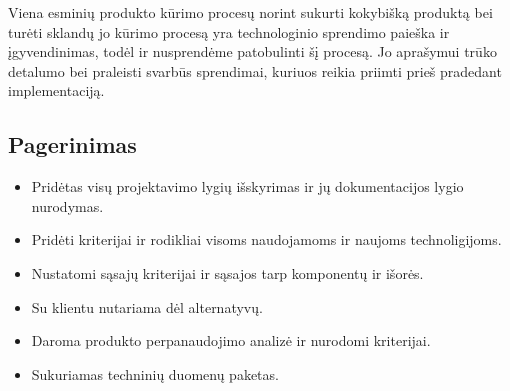 \documentclass{VUMIFPSkursinis}
\begin{document}
		Viena esminių produkto kūrimo procesų norint sukurti kokybišką produktą bei turėti sklandų jo kūrimo procesą yra technologinio sprendimo paieška ir įgyvendinimas, todėl ir nusprendėme patobulinti šį procesą. Jo aprašymui trūko detalumo bei praleisti svarbūs sprendimai, kuriuos reikia priimti prieš pradedant implementaciją.
		\subsection{Pagerinimas}
		\begin{itemize}
			\item{Pridėtas visų projektavimo lygių išskyrimas ir jų dokumentacijos lygio nurodymas.}
			\item{Pridėti kriterijai ir rodikliai visoms naudojamoms ir naujoms technoligijoms.}
			\item{Nustatomi sąsajų kriterijai ir sąsajos tarp komponentų ir išorės.}
			\item{Su klientu nutariama dėl alternatyvų.}
			\item{Daroma produkto perpanaudojimo analizė ir nurodomi kriterijai.}
			\item{Sukuriamas techninių duomenų paketas.}
\end{itemize}
\end{document}

